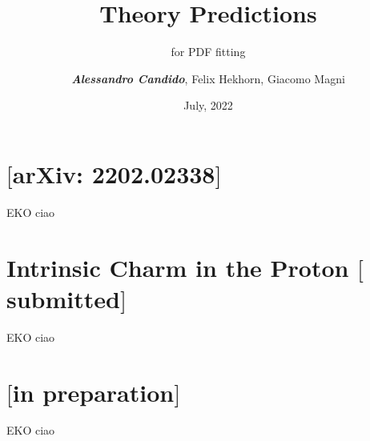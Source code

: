 \documentclass[9pt]{beamer}
\title{Theory Predictions}
\subtitle{for PDF fitting}
\date{July, 2022}
\author{\textit{\textbf{Alessandro Candido}}, Felix Hekhorn, Giacomo Magni}
\providecommand{\iRef}[1]{{\color{mLightGreen}\small $[$#1$]$}}
\begin{document}
\maketitle

\section{\eko{} \iRef{arXiv: 2202.02338}}

\begin{frame}{EKO}
    ciao
\end{frame}

\section{Intrinsic Charm in the Proton \iRef{submitted}}

\begin{frame}{EKO}
    ciao
\end{frame}

\section{\yadism{} \iRef{in preparation}}

\begin{frame}{EKO}
    ciao
\end{frame}
\end{document}
